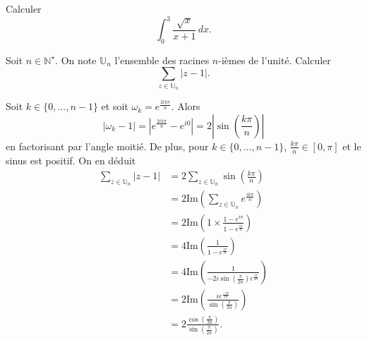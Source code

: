 \documentclass[a4paper, 11pt,openany]{book}%
\newtheorem[L]{thm}{Théorème}[section]
\newtheorem[M]{propo}[thm]{Proposition}
\newtheorem[M]{prop}[thm]{Propriété}
\newtheorem[M]{coro}[thm]{Corollaire}
\newtheorem[M]{lem}[thm]{Lemme}
\newtheorem[M,bodystyle=]{defi}[thm]{Définition}
\newtheorem[M,bodystyle=]{remark}[thm]{Remarque}
\newtheorem[M,bodystyle=]{met}[thm]{Méthode}
\newtheorem[M,bodystyle=]{ret}[thm]{A retenir}
\newtheorem[M,bodystyle=]{idee}[thm]{Idée}
\newtheorem[style=S,underline=false,bodystyle=]{exem}[thm]{Exemple}
\newtheorem[S,underline=false,bodystyle=]{exo}[thm]{Exercice}
\newtheorem[S,underline=false,bodystyle=]{appli}[thm]{Application}
\newtheorem[S,underline=false,bodystyle=]{sol}[thm]{Solution}
\newtheorem[S,underline=false,bodystyle=]{hypo}[thm]{Hypothesis}
\newtheorem[S,underline=false,bodystyle=]{nota}[thm]{Notation}
\begin{document}
\begin{exo}

Calculer
\[ \int_0^3 \frac{\sqrt{x}}{x +1} \, dx.\]

\end{exo}


\begin{sol}

%
\end{sol}

\begin{exo}

Soit $n \in \mathbb{N}^{\star}$. On note $\mathbb{U}_n$ l'ensemble des racines $n$-ièmes de l'unité. Calculer 
\[ \sum_{z \in \mathbb{U}_n} |z-1|.\]

\end{exo}


\begin{sol}

Soit $k \in \{0,...,n-1\}$ et soit $\omega_k =e^{ \frac{2ik\pi}{n}}$. Alors 
\[ |\omega_k-1|=|e^{\frac{2ik\pi}{n}} - e^{i0}|=2 \left| \sin \left( \frac{k \pi}{n} \right) \right| \]
en factorisant par l'angle moitié. De plus, pour $k \in \{0,...,n-1\}$, $\frac{k \pi}{n} \in [0,\pi]$ et le sinus est positif. On en déduit
\begin{align*}
\sum_{z \in \mathbb{U}_n} |z-1| & =    2 \sum_{z \in \mathbb{U}_n} \sin \left( \frac{k \pi}{n} \right) \\ 
 &= 2 \text{Im} \left(  \sum_{z \in \mathbb{U}_n} e^{\frac{ik \pi}{n}}  \right)\\ 
 &= 2 \text{Im} \left( 1 \times \frac{1 - e^{i \pi}}{1 - e^{\frac{ i\pi}{n}}} \right)\\
  &= 4 \text{Im} \left( \frac{1}{1 - e^{\frac{ i\pi}{n}}}\right)\\ 
 &= 4 \text{Im} \left( \frac{1}{-2i \sin \left( \frac{\pi}{2n} \right) e^{\frac{ i\pi}{2n}}}\right)\\ 
  &= 2 \text{Im} \left( \frac{ie^{\frac{ -i\pi}{2n}}}{\sin \left( \frac{\pi}{2n} \right)}\right)\\ 
    &= 2 \frac{\cos \left( \frac{\pi}{2n} \right)}{\sin \left( \frac{\pi}{2n} \right)}.
\end{align*}

\end{sol}
\end{document}
